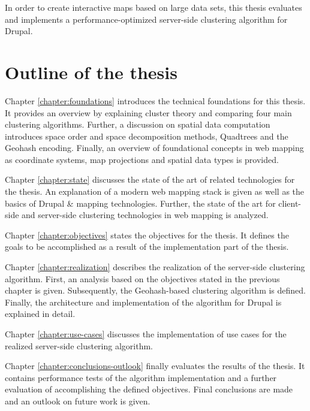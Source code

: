 In order to create interactive maps based on large data sets, this thesis evaluates and implements a performance-optimized server-side clustering algorithm for Drupal.


\section{Outline of the thesis}

Chapter \ref{chapter:foundations} introduces the technical foundations for this thesis. It provides an overview by explaining cluster theory and comparing four main clustering algorithms. Further, a discussion on spatial data computation introduces space order and space decomposition methods, Quadtrees and the Geohash encoding. Finally, an overview of foundational concepts in web mapping as coordinate systems, map projections and spatial data types is provided. 

Chapter \ref{chapter:state} discusses the state of the art of related technologies for the thesis. An explanation of a modern web mapping stack is given as well as the basics of Drupal \& mapping technologies. Further, the state of the art for client-side and server-side clustering technologies in web mapping is analyzed.

Chapter \ref{chapter:objectives} states the objectives for the thesis. It defines the goals to be accomplished as a result of the implementation part of the thesis.

Chapter \ref{chapter:realization} describes the realization of the server-side clustering algorithm. First, an analysis based on the objectives stated in the previous chapter is given. Subsequently, the Geohash-based clustering algorithm is defined. Finally, the architecture and implementation of the algorithm for Drupal is explained in detail.

Chapter \ref{chapter:use-cases} discusses the implementation of use cases for the realized server-side clustering algorithm.

Chapter \ref{chapter:conclusions-outlook} finally evaluates the results of the thesis. It contains performance tests of the algorithm implementation and a further evaluation of accomplishing the defined objectives. Final conclusions are made and an outlook on future work is given.